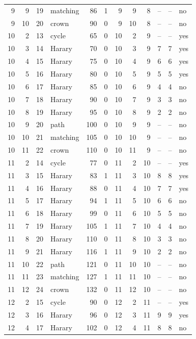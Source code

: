 {\begin{longtable}{rrrlrrrrrrrl}
9 & 9 & 19 & matching & 86 & 1 & 9 & 9 & 8 & -- & -- & no\\
9 & 10 & 20 & crown & 90 & 0 & 9 & 10 & 8 & -- & -- & no\\
10 & 2 & 13 & cycle & 65 & 0 & 10 & 2 & 9 & -- & -- & yes\\
10 & 3 & 14 & Harary & 70 & 0 & 10 & 3 & 9 & 7 & 7 & yes\\
10 & 4 & 15 & Harary & 75 & 0 & 10 & 4 & 9 & 6 & 6 & yes\\
10 & 5 & 16 & Harary & 80 & 0 & 10 & 5 & 9 & 5 & 5 & yes\\
10 & 6 & 17 & Harary & 85 & 0 & 10 & 6 & 9 & 4 & 4 & no\\
10 & 7 & 18 & Harary & 90 & 0 & 10 & 7 & 9 & 3 & 3 & no\\
10 & 8 & 19 & Harary & 95 & 0 & 10 & 8 & 9 & 2 & 2 & no\\
10 & 9 & 20 & path & 100 & 0 & 10 & 9 & 9 & -- & -- & no\\
10 & 10 & 21 & matching & 105 & 0 & 10 & 10 & 9 & -- & -- & no\\
10 & 11 & 22 & crown & 110 & 0 & 10 & 11 & 9 & -- & -- & no\\
11 & 2 & 14 & cycle & 77 & 0 & 11 & 2 & 10 & -- & -- & yes\\
11 & 3 & 15 & Harary & 83 & 1 & 11 & 3 & 10 & 8 & 8 & yes\\
11 & 4 & 16 & Harary & 88 & 0 & 11 & 4 & 10 & 7 & 7 & yes\\
11 & 5 & 17 & Harary & 94 & 1 & 11 & 5 & 10 & 6 & 6 & no\\
11 & 6 & 18 & Harary & 99 & 0 & 11 & 6 & 10 & 5 & 5 & no\\
11 & 7 & 19 & Harary & 105 & 1 & 11 & 7 & 10 & 4 & 4 & no\\
11 & 8 & 20 & Harary & 110 & 0 & 11 & 8 & 10 & 3 & 3 & no\\
11 & 9 & 21 & Harary & 116 & 1 & 11 & 9 & 10 & 2 & 2 & no\\
11 & 10 & 22 & path & 121 & 0 & 11 & 10 & 10 & -- & -- & no\\
11 & 11 & 23 & matching & 127 & 1 & 11 & 11 & 10 & -- & -- & no\\
11 & 12 & 24 & crown & 132 & 0 & 11 & 12 & 10 & -- & -- & no\\
12 & 2 & 15 & cycle & 90 & 0 & 12 & 2 & 11 & -- & -- & yes\\
12 & 3 & 16 & Harary & 96 & 0 & 12 & 3 & 11 & 9 & 9 & yes\\
12 & 4 & 17 & Harary & 102 & 0 & 12 & 4 & 11 & 8 & 8 & no\\

\end{longtable}}
